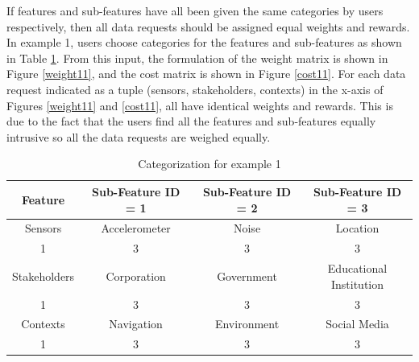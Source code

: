 If features and sub-features have all been given the same categories by users respectively, then all data requests should be assigned equal weights and rewards. In example 1, users choose categories for the features and sub-features as shown in Table \ref{tab:scenario11}. From this input, the formulation of the weight matrix is shown in Figure \ref{weight11}, and the cost matrix is shown in Figure \ref{cost11}.
For each data request indicated as a tuple (sensors, stakeholders, contexts) in the x-axis of Figures \ref{weight11} and \ref{cost11}, all have identical weights and rewards. This is due to the fact that the users find all the features and sub-features equally intrusive so all the data requests are weighed equally.

\begin{table}[h!]
  \centering
  \caption{Categorization for example 1}
  \label{tab:scenario11}
  \begin{tabular}{cccc}
    \toprule
    Feature & Sub-Feature ID = 1 & Sub-Feature ID = 2 & Sub-Feature ID = 3\\
    \midrule
    Sensors & Accelerometer & Noise & Location\\
     1 & 3 & 3 & 3\\ \hhline{====}
     Stakeholders & Corporation & Government & Educational Institution\\
     1 & 3 & 3 & 3\\ \hhline{====}
     Contexts & Navigation & Environment & Social Media\\
     1 & 3 & 3 & 3\\ 
    \bottomrule
  \end{tabular}
\end{table}
 
